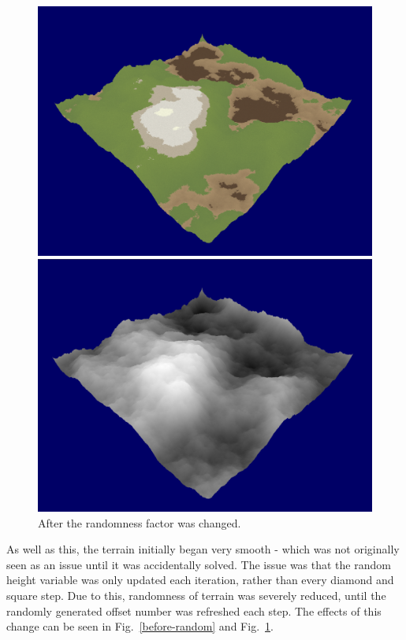 \documentclass[a4paper,10pt]{report}
\begin{document}
\begin{figure}[h!]
\centering
\begin{minipage}{.4\textwidth}
  \centering
  \includegraphics[width=.9\linewidth]{Images/Sprint-Images/Sprint-7-After-Colour.png}
\end{minipage}
\begin{minipage}{.4\textwidth}
  \centering
  \includegraphics[width=.9\linewidth]{Images/Sprint-Images/Sprint-7-After-Greyscale.png}
\end{minipage}
\caption{After the randomness factor was changed.}
\label{after-random}
\end{figure}


As well as this, the terrain initially began very smooth - which was not originally seen as an issue until it was accidentally solved. The issue was that the random height variable was only updated each iteration, rather than every diamond and square step. Due to this, randomness of terrain was severely reduced, until the randomly generated offset number was refreshed each step. The effects of this change can be seen in Fig.~\ref{before-random} and Fig.~\ref{after-random}.
\end{document}
